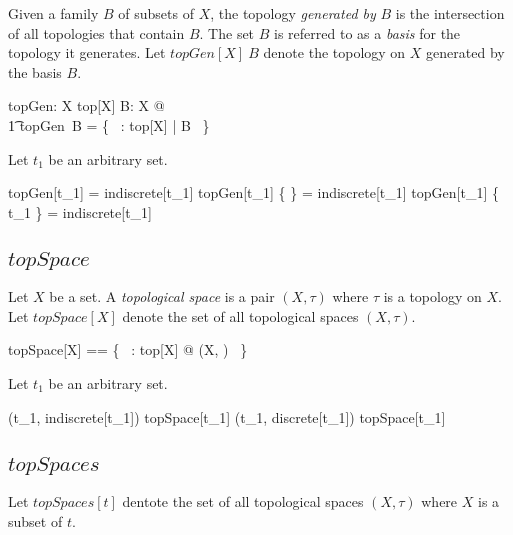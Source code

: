 \documentclass[11pt, oneside]{article}
\begin{document}
Given a family $B$ of subsets of $X$, the topology {\it generated by} $B$ is the intersection of all
topologies that contain $B$.
The set $B$ is referred to as a {\it basis} for the topology it generates.
Let $topGen[X]~B$ denote the topology on $X$ generated by the basis $B$.

\begin{gendef}[X]
	topGen: \family X \fun top[X]
\where
	\forall B: \family X @ \\
	\t1	topGen~B = \bigcap \{~ \tau: top[X] | B \subseteq \tau ~\}
\end{gendef}

\begin{example}
Let $t_1$ be an arbitrary set.

\begin{zed}
	topGen[t_1] \emptyset = indiscrete[t_1]
\also
	topGen[t_1] \{ \emptyset \} = indiscrete[t_1]
\also
	topGen[t_1] \{ t_1 \} = indiscrete[t_1]
\end{zed}

\end{example}

\subsection{$topSpace$}

Let $X$ be a set.
A {\it topological space} is a pair $(X, \tau)$ where $\tau$ is a topology on $X$.
Let $topSpace[X]$ denote the set of all topological spaces $(X,\tau)$.

\begin{zed}
	topSpace[X] == \{~ \tau: top[X] @ (X, \tau) ~\}
\end{zed}

\begin{example}
Let $t_1$ be an arbitrary set.

\begin{zed}
	(t_1, indiscrete[t_1]) \in topSpace[t_1]
\also
	(t_1, discrete[t_1]) \in topSpace[t_1]
\end{zed}


\end{example}

\subsection{$topSpaces$}

Let $topSpaces[t]$ dentote the set of all topological spaces $(X,\tau)$ where $X$ is a subset of $t$.
\end{document}
